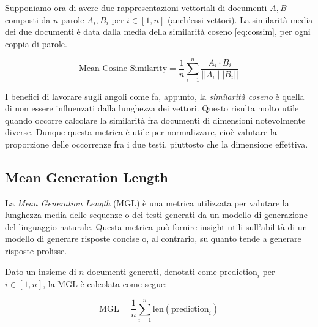 \documentclass[12pt,a4paper,twoside,openright]{book}
\begin{document}
Supponiamo ora di avere due rappresentazioni vettoriali di documenti $A, B$ composti da $n$ parole $A_i, B_i$ per $i \in [1, n]$ (anch'essi vettori). La similarità media dei due documenti è data dalla media della similarità coseno \ref{eq:cossim}, per ogni coppia di parole.

\begin{equation*}
    \text{Mean Cosine Similarity} = \frac{1}{n} \sum_{i=1}^n \frac{A_i \cdot B_i}{\vert \vert A_i \vert \vert \vert \vert B_i \vert \vert}
\end{equation*}

I benefici di lavorare sugli angoli come fa, appunto, la \emph{similarità coseno} è quella di non essere influenzati dalla lunghezza dei vettori. Questo risulta molto utile quando occorre calcolare la similarità fra documenti di dimensioni notevolmente diverse. Dunque questa metrica è utile per normalizzare, cioè valutare la proporzione delle occorrenze fra i due testi, piuttosto che la dimensione effettiva.


\subsection{Mean Generation Length}
La \emph{Mean Generation Length} (MGL) è una metrica utilizzata per valutare la lunghezza media delle sequenze o dei testi generati da un modello di generazione del linguaggio naturale. Questa metrica può fornire insight utili sull'abilità di un modello di generare risposte concise o, al contrario, su quanto tende a generare risposte prolisse.

Dato un insieme di $n$ documenti generati, denotati come $\text{prediction}_i$ per $i \in [1,n]$, la MGL è calcolata come segue:

\begin{equation*}
    \text{MGL} = \frac{1}{n} \sum_{i=1}^n \text{len}(\text{prediction}_i)
\end{equation*}
\end{document}
